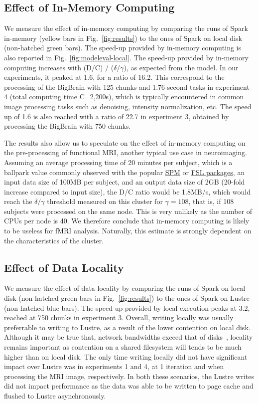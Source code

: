 \documentclass{IEEEtran}
\begin{document}
\subsection{Effect of In-Memory Computing}
We measure the effect of in-memory computing by comparing the runs 
of Spark in-memory (yellow bars in Fig.~\ref{fig:results}) to the ones 
of Spark on local disk (non-hatched green bars). The speed-up provided 
by in-memory computing is also reported in 
Fig.~\ref{fig:modeleval-local}. The speed-up provided by in-memory 
computing increases with (D/C) / ($\delta$/$\gamma$), as expected from 
the model. In our experiments, it peaked at 1.6, for a ratio of 16.2. 
This correspond to the processing of the BigBrain with 125 chunks and 
1.76-second tasks in experiment 4 (total computing time C=2,200s), 
which is typically encountered in common image processing tasks such as 
denoising, intensity normalization, etc. The speed up of 1.6 is also 
reached with a ratio of 22.7 in experiment 3, obtained by processing 
the BigBrain with 750 chunks.

The results also allow us to speculate on the effect of in-memory 
computing on the pre-processing of functional MRI, another typical use 
case in neuroimaging. Assuming an average processing time of 20 minutes 
per subject, which is a ballpark value commonly observed with the 
popular \href{https://www.fil.ion.ucl.ac.uk/spm/}{SPM} or \href{https://fsl.fmrib.ox.ac.uk/fsl/fslwiki/}{FSL packages},
an input data size of 100MB per subject, 
and an output data size of 2GB (20-fold increase compared to input 
size), the D/C ratio would be 1.8MB/s, which would reach the 
$\delta/\gamma$ threshold measured on this cluster for $\gamma=108$, 
that is, if 108 subjects were processed on the same node. This is very 
unlikely as the number of CPUs per node is 40. We therefore conclude 
that in-memory computing is likely to be useless for fMRI analysis.
Naturally, this estimate is strongly dependent on the characteristics of the cluster.

\subsection{Effect of Data Locality}

We measure the effect of data locality by comparing the runs of Spark
on local disk (non-hatched green bars in Fig.~\ref{fig:results}) to the 
ones of Spark on Lustre (non-hatched blue bars). The speed-up provided by 
local execution peaks at 3.2, reached at 750 chunks in experiment 3. Overall, 
writing locally was usually preferrable to writing to Lustre, as a result of the
lower contention on local disk. Although it may be true that,
network bandwidths exceed that of disks~\cite{ananthanarayanan2011disk},
locality remains important 
as contention on a shared filesystem will tends to be much higher than on local disk.
The only time writing locally did not
have significant impact over Lustre was in experiments 1 and 4, at 1 iteration and 
when processing the MRI image, respectively. In both these scenarios, the Lustre 
writes did not impact performance as the data was able to be written to page cache
and flushed to Lustre asynchronously.
\end{document}
